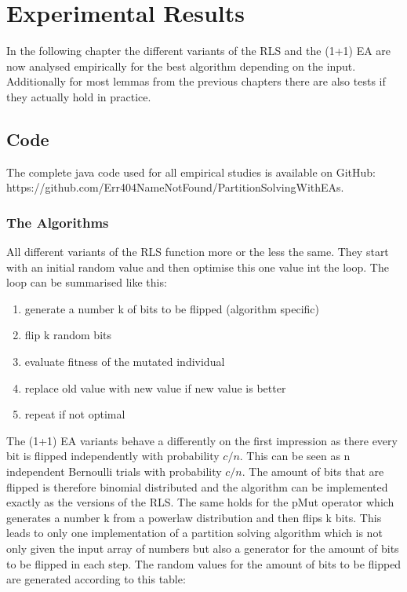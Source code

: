 \chapter{Experimental Results}\label{ch:expRes}

In the following chapter the different variants of the RLS and the (1+1) EA are now analysed empirically for the best algorithm depending on the input. Additionally for most lemmas from the previous chapters there are also tests if they actually hold in practice.

\section{Code}
The complete java code used for all empirical studies is available on GitHub:\newline
https://github.com/Err404NameNotFound/PartitionSolvingWithEAs.\newline
\subsection{The Algorithms}
All different variants of the RLS function more or the less the same. They start with an initial random value and then optimise this one value int the loop. The loop can be summarised like this:
\begin{enumerate}
      \item generate a number k of bits to be flipped (algorithm specific)
      \item flip k random bits
      \item evaluate fitness of the mutated individual
      \item replace old value with new value if new value is better
      \item repeat if not optimal
\end{enumerate}
The (1+1) EA variants behave a differently on the first impression as there every bit is flipped independently with probability $c/n$. This can be seen as n independent Bernoulli trials with probability $c/n$. The amount of bits that are flipped is therefore binomial distributed and the algorithm can be implemented exactly as the versions of the RLS. The same holds for the pMut operator which generates a number k from a powerlaw distribution and then flips k bits. This leads to only one implementation of a partition solving algorithm which is not only given the input array of numbers but also a generator for the amount of bits to be flipped in each step. The random values for the amount of bits to be flipped are generated according to this table:

